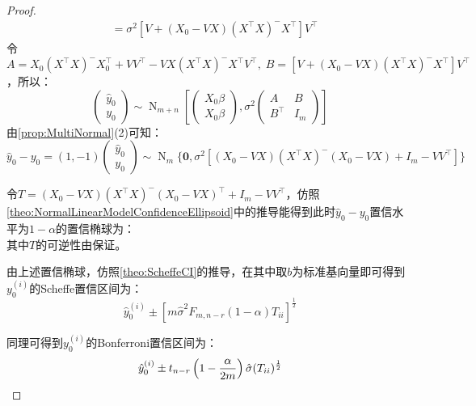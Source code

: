 \begin{proof}
\begin{align*}
		&=\sigma^2[V+(X_0-VX)(X^{\top}X)^-X^{\top}]V^{\top}
	\end{align*}
	令$A=X_0(X^{\top}X)^-X_0^{\top}+VV^{\top}-VX(X^{\top}X)^-X^{\top}V^{\top},\;B=[V+(X_0-VX)(X^{\top}X)^-X^{\top}]V^{\top}$，所以：
	\begin{equation*}
		\begin{pmatrix}
			\hat{y}_0 \\
			y_0
		\end{pmatrix}\sim\operatorname{N}_{m+n}\left[
		\begin{pmatrix}
			X_0\beta \\
			X_0\beta
		\end{pmatrix},\sigma^2
		\begin{pmatrix}
			A & B \\
			B^{\top} & I_m
		\end{pmatrix}
		\right]
	\end{equation*}
	由\cref{prop:MultiNormal}(2)可知：
	\begin{equation*}
		\hat{y}_0-y_0=
		(1,-1)
		\begin{pmatrix}
			\hat{y}_0 \\
			y_0
		\end{pmatrix}\sim\operatorname{N}_m\{
		\mathbf{0},\sigma^2[(X_0-VX)(X^{\top}X)^-(X_0-VX)+I_m-VV^{\top}]\}
	\end{equation*}\par
	令$T=(X_0-VX)(X^{\top}X)^-(X_0-VX)^{\top}+I_m-VV^{\top}$，仿照\cref{theo:NormalLinearModelConfidenceEllipsoid}中的推导能得到此时$\hat{y}_0-y_0$置信水平为$1-\alpha$的置信椭球为：
	\begin{equation*}
		[\hat{y}_0-y_0:(\hat{y}_0-y_0)^{\top}(T)^{-1}(\hat{y}_0-y_0)\leqslant m\hat{\sigma}^2F_{m,n-r}(1-\alpha)]
	\end{equation*}
	其中$T$的可逆性由保证。\par
	由上述置信椭球，仿照\cref{theo:ScheffeCI}的推导，在其中取$b$为标准基向量即可得到$y_0^{(i)}$的Scheffe置信区间为：
	\begin{equation*}
		\hat{y}_0^{(i)}\pm[m\hat{\sigma}^2F_{m,n-r}(1-\alpha)T_{ii}]^{\frac{1}{2}}
	\end{equation*}\par
	同理可得到$y_0^{(i)}$的Bonferroni置信区间为：
	\begin{equation*}
		\hat{y}_0^{(i)}\pm t_{n-r}\left(1-\frac{\alpha}{2m}\right)\hat{\sigma}(T_{ii})^{\frac{1}{2}}\qedhere
	\end{equation*}
\end{proof}








